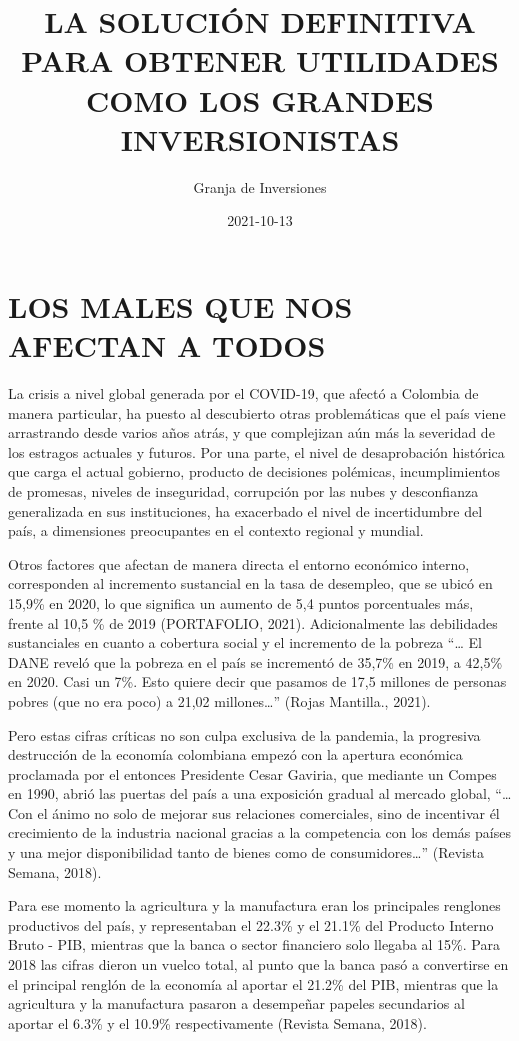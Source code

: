 \documentclass[
]{book}
\title{LA SOLUCIÓN DEFINITIVA PARA OBTENER UTILIDADES COMO LOS GRANDES INVERSIONISTAS}
\author{Granja de Inversiones}
\date{2021-10-13}
\begin{document}
\maketitle

{
\setcounter{tocdepth}{1}
\tableofcontents
}
\hypertarget{los-males-que-nos-afectan-a-todos}{%
\chapter{LOS MALES QUE NOS AFECTAN A TODOS}\label{los-males-que-nos-afectan-a-todos}}

La crisis a nivel global generada por el COVID-19, que afectó a Colombia de manera particular, ha puesto al descubierto otras problemáticas que el país viene arrastrando desde varios años atrás, y que complejizan aún más la severidad de los estragos actuales y futuros. Por una parte, el nivel de desaprobación histórica que carga el actual gobierno, producto de decisiones polémicas, incumplimientos de promesas, niveles de inseguridad, corrupción por las nubes y desconfianza generalizada en sus instituciones, ha exacerbado el nivel de incertidumbre del país, a dimensiones preocupantes en el contexto regional y mundial.

Otros factores que afectan de manera directa el entorno económico interno, corresponden al incremento sustancial en la tasa de desempleo, que se ubicó en 15,9\% en 2020, lo que significa un aumento de 5,4 puntos porcentuales más, frente al 10,5 \% de 2019 (PORTAFOLIO, 2021). Adicionalmente las debilidades sustanciales en cuanto a cobertura social y el incremento de la pobreza ``\ldots{} El DANE reveló que la pobreza en el país se incrementó de 35,7\% en 2019, a 42,5\% en 2020. Casi un 7\%. Esto quiere decir que pasamos de 17,5 millones de personas pobres (que no era poco) a 21,02 millones\ldots{}'' (Rojas Mantilla., 2021).

Pero estas cifras críticas no son culpa exclusiva de la pandemia, la progresiva destrucción de la economía colombiana empezó con la apertura económica proclamada por el entonces Presidente Cesar Gaviria, que mediante un Compes en 1990, abrió las puertas del país a una exposición gradual al mercado global, ``\ldots{} Con el ánimo no solo de mejorar sus relaciones comerciales, sino de incentivar él crecimiento de la industria nacional gracias a la competencia con los demás países y una mejor disponibilidad tanto de bienes como de consumidores\ldots{}'' (Revista Semana, 2018).

Para ese momento la agricultura y la manufactura eran los principales renglones productivos del país, y representaban el 22.3\% y el 21.1\% del Producto Interno Bruto - PIB, mientras que la banca o sector financiero solo llegaba al 15\%. Para 2018 las cifras dieron un vuelco total, al punto que la banca pasó a convertirse en el principal renglón de la economía al aportar el 21.2\% del PIB, mientras que la agricultura y la manufactura pasaron a desempeñar papeles secundarios al aportar el 6.3\% y el 10.9\% respectivamente (Revista Semana, 2018).
\end{document}
